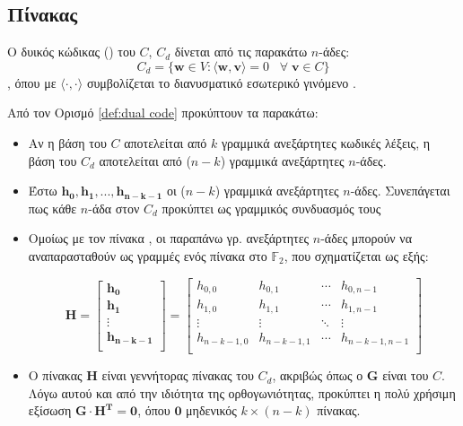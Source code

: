 \subsection{Πίνακας }
\begin{definition}
Ο δυικός κώδικας () του $C$, $C_d$ δίνεται από τις παρακάτω $n$-άδες:$$C_d=\lbrace\mathbf{w}\in V:\langle \mathbf{w,v} \rangle =0\;\;\;\forall\;\mathbf{v}\in C\rbrace$$,
όπου με $\langle\cdot,\cdot\rangle$ συμβολίζεται το διανυσματικό εσωτερικό γινόμενο \cite{ryan2009channel}.
\label{def:dual code}
\end{definition}

Από τον Ορισμό \ref{def:dual code} προκύπτουν τα παρακάτω:

\begin{itemize}
\item Αν η βάση του $C$ αποτελείται από $k$ γραμμικά ανεξάρτητες κωδικές λέξεις, η βάση του $C_d$ αποτελείται από ($n-k$) γραμμικά ανεξάρτητες $n$-άδες.
\item Έστω $\mathbf{h_0, h_1, ..., h_{n-k-1}}$ οι ($n-k$) γραμμικά ανεξάρτητες $n$-άδες. Συνεπάγεται πως κάθε $n$-άδα στον $C_d$ προκύπτει ως γραμμικός συνδυασμός τους
\item Ομοίως με τον πίνακα , οι παραπάνω γρ. ανεξάρτητες $n$-άδες μπορούν να αναπαρασταθούν ως γραμμές ενός πίνακα στο $\mathbb{F}_2$, που σχηματίζεται ως εξής:

\begin{equation}
\mathbf{H}=\begin{bmatrix}\mathbf{h_0}\\\mathbf{h_1}\\\vdots\\\mathbf{h_{n-k-1}}\\\end{bmatrix}=\begin{bmatrix}h_{0,0} & h_{0,1} & \cdots & h_{0,n-1}\\h_{1,0} & h_{1,1} & \cdots & h_{1,n-1}\\\vdots & \vdots & \ddots & \vdots\\h_{n-k-1,0} & h_{n-k-1,1} & \cdots & h_{n-k-1,n-1}\\\end{bmatrix}
\label{eq:parity check matrix}
\end{equation}
\item Ο πίνακας $\mathbf{H}$ είναι γεννήτορας πίνακας του $C_d$, ακριβώς όπως ο $\mathbf{G}$ είναι του $C$. Λόγω αυτού και από την ιδιότητα της ορθογωνιότητας, προκύπτει η πολύ χρήσιμη εξίσωση $\mathbf{G} \cdot \mathbf{H^T} = \mathbf{0}$, όπου $\mathbf{0}$ μηδενικός $k \times (n-k)$ πίνακας.
\end{itemize}

